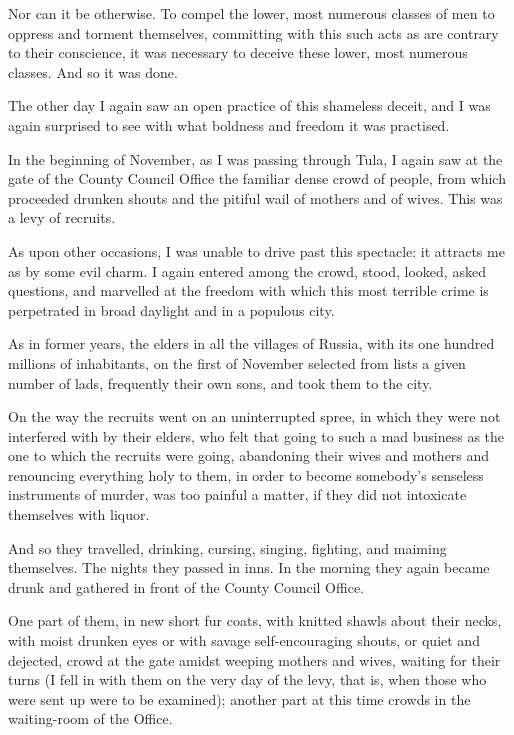 \documentclass{book}
\begin{document}
Nor can it be otherwise. To compel the lower, most numerous classes of men to oppress and torment themselves, committing with this such acts as are contrary to their conscience, it was necessary to deceive these lower, most numerous classes. And so it was done.

The other day I again saw an open practice of this shameless deceit, and I was again surprised to see with what boldness and freedom it was practised.

In the beginning of November, as I was passing through Tula, I again saw at the gate of the County Council Office the familiar dense crowd of people, from which proceeded drunken shouts and the pitiful wail of mothers and of wives. This was a levy of recruits.

As upon other occasions, I was unable to drive past this spectacle: it attracts me as by some evil charm. I again entered among the crowd, stood, looked, asked questions, and marvelled at the freedom with which this most terrible crime is perpetrated in broad daylight and in a populous city.

As in former years, the elders in all the villages of Russia, with its one hundred millions of inhabitants, on the first of November selected from lists a given number of lads, frequently their own sons, and took them to the city.

On the way the recruits went on an uninterrupted spree, in which they were not interfered with by their elders, who felt that going to such a mad business as the one to which the recruits were going, abandoning their wives and mothers and renouncing everything holy to them, in order to become somebody’s senseless instruments of murder, was too painful a matter, if they did not intoxicate themselves with liquor.

And so they travelled, drinking, cursing, singing, fighting, and maiming themselves. The nights they passed in inns. In the morning they again became drunk and gathered in front of the County Council Office.

One part of them, in new short fur coats, with knitted shawls about their necks, with moist drunken eyes or with savage self-encouraging shouts, or quiet and dejected, crowd at the gate amidst weeping mothers and wives, waiting for their turns (I fell in with them on the very day of the levy, that is, when those who were sent up were to be examined); another part at this time crowds in the waiting-room of the Office.
\end{document}
